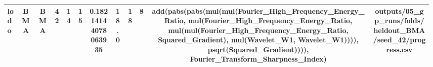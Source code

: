 \begin{table}[t]
\begin{tabular}{lccccccccccc}
lodo & BMA & BMA & 42 & 14 & 15 & 0.18214144078063935 & 18.0 & 18 & 8 & add(pabs(pabs(mul(mul(Fourier\_High\_Frequency\_Energy\_Ratio, mul(Fourier\_High\_Frequency\_Energy\_Ratio, mul(mul(Fourier\_High\_Frequency\_Energy\_Ratio, Squared\_Gradient), mul(Wavelet\_W1, Wavelet\_W1)))), psqrt(Squared\_Gradient)))), Fourier\_Transform\_Sharpness\_Index) & outputs/05\_gp\_runs/folds/heldout\_BMA/seed\_42/progress.csv \\
\hline
\end{tabular}
\end{table}